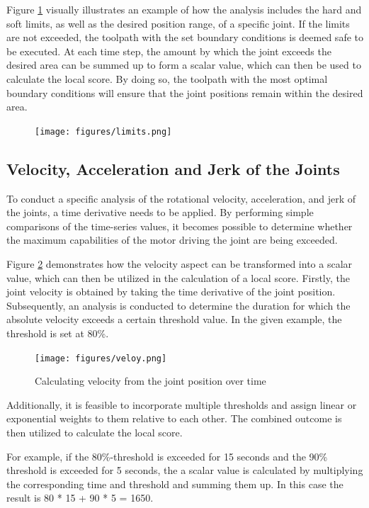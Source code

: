 Figure \ref{limits} visually illustrates an example of how the analysis includes the hard and soft limits, as well as the desired position range, of a specific joint. If the limits are not exceeded, the toolpath with the set boundary conditions is deemed safe to be executed. At each time step, the amount by which the joint exceeds the desired area can be summed up to form a scalar value, which can then be used to calculate the local score. By doing so, the toolpath with the most optimal boundary conditions will ensure that the joint positions remain within the desired area.

\begin{figure}[H]
	\centerline{\texttt{[image: figures/limits.png]}}
	\caption{}
	\label{limits}
\end{figure}

\subsection{Velocity, Acceleration and Jerk of the Joints}\label{VAJJ}
To conduct a specific analysis of the rotational velocity, acceleration, and jerk of the joints, a time derivative needs to be applied. By performing simple comparisons of the time-series values, it becomes possible to determine whether the maximum capabilities of the motor driving the joint are being exceeded.

Figure \ref{velo} demonstrates how the velocity aspect can be transformed into a scalar value, which can then be utilized in the calculation of a local score. Firstly, the joint velocity is obtained by taking the time derivative of the joint position. Subsequently, an analysis is conducted to determine the duration for which the absolute velocity exceeds a certain threshold value. In the given example, the threshold is set at 80\%. 

\begin{figure}[H]
	\centerline{\texttt{[image: figures/veloy.png]}}
	\caption{Calculating velocity from the joint position over time}
	\label{velo}
\end{figure}

Additionally, it is feasible to incorporate multiple thresholds and assign linear or exponential weights to them relative to each other. The combined outcome is then utilized to calculate the local score.


For example, if the 80\%-threshold is exceeded for 15 seconds and the 90\% threshold is exceeded for 5 seconds, the a scalar value is calculated by multiplying the corresponding time and threshold and summing them up. In this case the result is 80 * 15 + 90 * 5 = 1650.

